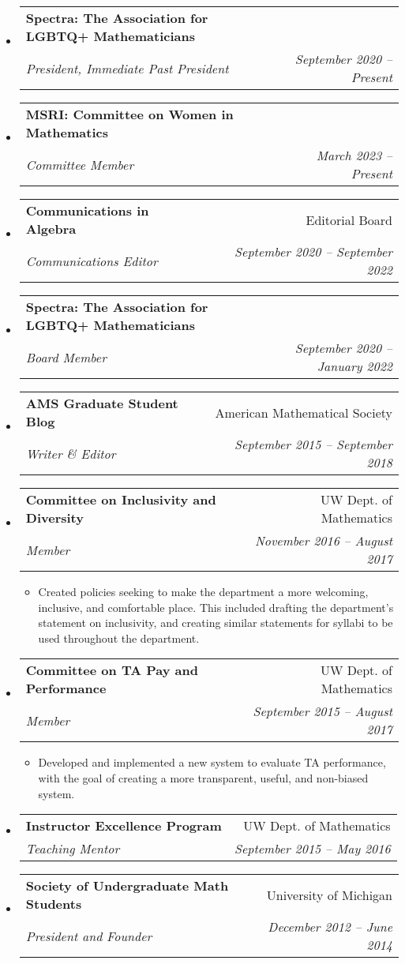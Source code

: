 \documentclass[letterpaper,11pt]{article}
\makeatletter
\newcommand{\resitem}[1]{\item #1 \vspace{-2pt}}
\newcommand{\ressubheading}[4]{
\begin{tabular*}{6.5in}[t]{l@{\cftdotfill{\cftsecdotsep}\extracolsep{\fill}}r}
		\textbf{#1} & #2 \\
		\textit{#3} & \textit{#4} \\
\end{tabular*}\vspace{-6pt}}
\makeatother
\begin{document}
\begin{itemize}
\item 
	\ressubheading{Spectra: The Association for LGBTQ+ Mathematicians }{}{President, Immediate Past President}{September 2020 -- Present}
	
\item 
	\ressubheading{MSRI: Committee on Women in Mathematics }{}{Committee Member}{March 2023 -- Present}
	
\item 
	\ressubheading{Communications in Algebra }{Editorial Board}{Communications Editor}{September 2020 -- September 2022}
	
\item 
	\ressubheading{Spectra: The Association for LGBTQ+ Mathematicians }{}{Board Member}{September 2020 -- January 2022}
	
\item 
	\ressubheading{AMS Graduate Student Blog}{American Mathematical Society}{Writer \& Editor}{September 2015 -- September 2018}
	

\item 
	\ressubheading{Committee on Inclusivity and Diversity}{UW Dept. of Mathematics}{Member}{November 2016 -- August 2017}
	\begin{itemize}
		\resitem{Created policies seeking to make the department a more welcoming, inclusive, and comfortable place. This included drafting the department's statement on inclusivity, and creating similar statements for syllabi to be used throughout the department.}
	\end{itemize}

\item 
	\ressubheading{Committee on TA Pay and Performance}{UW Dept. of Mathematics}{Member}{September 2015 -- August 2017}
	\begin{itemize}
		\resitem{Developed and implemented a new system to evaluate TA performance, with the goal of creating a more transparent, useful, and non-biased system.}
	\end{itemize}
	
\item 
	\ressubheading{Instructor Excellence Program}{UW Dept. of Mathematics}{Teaching Mentor}{September 2015 -- May 2016}

\item 
	\ressubheading{Society of Undergraduate Math Students}{University of Michigan}{President and Founder}{December 2012 -- June 2014}

\end{itemize}
\end{document}
